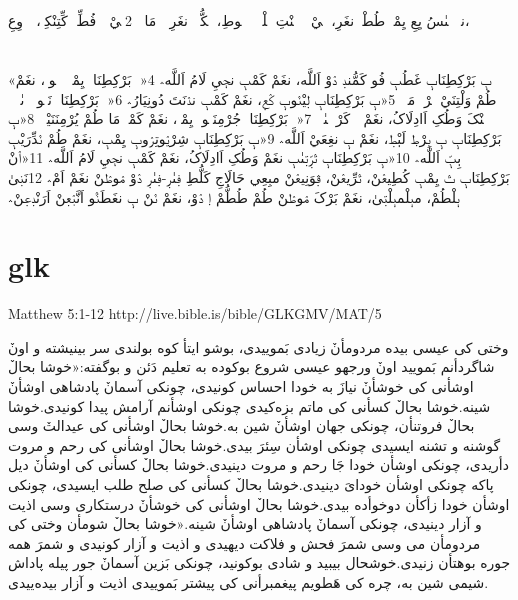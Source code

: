 \documentclass[12pt,fleqn,titlepage,twoside,a4paper]{book}
\begin{document}
\begin{arab}[utf]
\section*{}

ندٜ يٜىٰسُ يِعِ يِمْٻٜ طُطْٻٜ نغَرِ، سٜيْ اٛ پٜنْتِ پٛلْدٜ اٛ جٛوطِ، تٛکُّٻٜمٛ نغَرِ تٛ مَاکٛ؞ 2سٜيْ اٛ فُطِّ اٜکِّتِنْکِٻٜ، اٛ وِعِ،

\section*{}

«‏ٻٜ بَرْکِطِنَاٻٜ غَطُٻٜ فُو کَمُّندٜ دٛوْ اَللَّه،
نغَمْ کَمْٻٜ نجٜيِ لَامُ اَللَّه؞
4‏«‏ٻٜ بَرْکِطِنَاٻٜ يِمْٻٜ وٛيٛوٻٜ،
نغَمْ طُمْ وَلْتِنَيْ ٻٜرْطٜ مَٻّٜ؞
5‏«‏ٻٜ بَرْکِطِنَاٻٜ لٜيْنٛوٻٜ کٛعٜ،
نغَمْ کَمْٻٜ ندٛنَتَ دُونِيَارُ؞
6‏«‏ٻٜ بَرْکِطِنَاٻٜ نَنٛوٻٜ وٜىٰلٛ
اٜ طٛنْکَ وَطُکِ اَادِلَاکُ،
نغَمْ ٻٜ کَرْنٜتٜىٰٻٜ؞
7‏«‏ٻٜ بَرْکِطِنَاٻٜ جُرْمِنَنٛوٻٜ يِمْٻٜ،
نغَمْ کَمْٻٜ مَا طُمْ يُرْمِنَنَيْٻٜ؞
8‏«‏ٻٜ بَرْکِطِنَاٻٜ ٻٜ ٻٜرْطٜ لَٻْطٜ،
نغَمْ ٻٜ نغِعَيْ اَللَّه؞
9‏«‏ٻٜ بَرْکِطِنَاٻٜ شِرْيٛوتِرٛوٻٜ يِمْٻٜ،
نغَمْ طُمْ نٛدِّرَيْٻٜ ٻِٻّٜ اَللَّه؞
10‏«‏ٻٜ بَرْکِطِنَاٻٜ تٛرّٜتٜىٰٻٜ نغَمْ وَطُکِ
اَادِلَاکُ،
نغَمْ کَمْٻٜ نجٜيِ لَامُ اَللَّه؞
11‏«‏اٛنْ بَرْکِطِنَاٻٜ تٛ يِمْٻٜ کُطِيعٛنْ، تٛرِّيعٛنْ، ڤٜوَنِيعٛنْ مبِعِي حَالَاجِ کَلُّطِ فٜىٰرٜ‑فٜىٰرٜ دٛوْ مٛوطٛنْ نغَمْ اَمْ؞ 12نَنٜىٰ بٜلْطُمْ، مبٜلْمبٜلْتٜىٰ، نغَمْ بَرْکَ مٛوطٛنْ طُمْ طُطُّمْ اٜ دٛوْ، نغَمْ نٛنْ ٻٜ نغَطَنّٛو اَنَّبٛعٜنْ اَرَنْدٜعٜنْ؞

\end{arab}

\section{glk}

Matthew 5:1-12 http://live.bible.is/bible/GLKGMV/MAT/5

\begin{arab}[utf]

وختی کی عیسی بیده مردومأنٚ زیادی بَموییدی، بوشو ایتأ کوه بولندی سر بینیشته و اونٚ شاگردأنم بَمویید اونٚ ورجهو عیسی شروع بوکوده به تعلیم دَئن و بوگفته:«خوشا بحالٚ اوشأنی کی خوشأنٚ نیازَ به خودا احساس کونیدی، چونکی آسمانٚ پادشاهی اوشأنٚ شینه.خوشا بحالٚ کسأنی کی ماتم بزه‌کیدی چونکی اوشأنم آرامش پیدا کونیدی.خوشا بحالٚ فروتنأن، چونکی جهان اوشأنٚ شین به.خوشا بحالٚ اوشأنی کی عیدالتٚ وسی گوشنه و تشنه ایسیدی چونکی اوشأن سِئرَ بیدی.خوشا بحالٚ اوشأنی کی رحم و مروت دأریدی، چونکی اوشأن خودا جَا رحم و مروت دینیدی.خوشا بحالٚ کسأنی کی اوشأنٚ دیل پاکه چونکی اوشأن خودایَ دینیدی.خوشا بحالٚ کسأنی کی صلح طلب ایسیدی، چونکی اوشأن خودا زأکأن دوخوأده بیدی.خوشا بحالٚ اوشأنی کی خوشأنٚ درستکاری وسی اذیت و آزار دینیدی، چونکی آسمانٚ پادشاهی اوشأنٚ شینه.«خوشا بحالٚ شومأن وختی کی مردومأن می وسی شمرَ فحش و فلاکت دیهیدی و اذیت و آزار کونیدی و شمرَ همه جوره بوهتأن زنیدی.خوشحال بیبید و شادی بوکونید، چونکی بَزین آسمانٚ جور پیله پاداش شیمی شین به، چره کی هَطویم پیغمبرأنی کی پیشتر بَموییدی اذیت و آزار بیده‌ییدی.

\end{arab}
\end{document}
